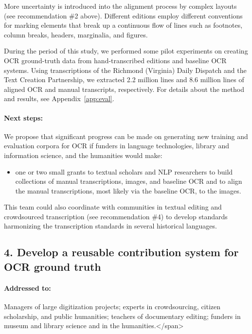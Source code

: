 \documentclass[twoside,11pt]{report}
\begin{document}
More uncertainty is introduced into the alignment process by complex layouts (see recommendation \#2 above). Different editions employ different conventions for marking elements that break up a continuous flow of lines such as footnotes, column breaks, headers, marginalia, and figures.

During the period of this study, we performed some pilot experiments on creating OCR ground-truth data from hand-transcribed editions and baseline OCR systems. Using transcriptions of the Richmond (Virginia) Daily Dispatch and the Text Creation Partnership, we extracted 2.2 million lines and 8.6 million lines of aligned OCR and manual transcripts, respectively. For details about the method and results, see Appendix~\ref{app:eval}.

\paragraph{Next steps:} We propose that significant progress can be made on generating new training and evaluation corpora for OCR if funders in language technologies, library and information science, and the humanities would make:
\begin{itemize}

\item one or two small grants to textual scholars and NLP researchers to build collections of manual transcriptions, images, and baseline OCR and to align the manual transcriptions, most likely via the baseline OCR, to the images.
  
\end{itemize}

This team could also coordinate with communities in textual editing and crowdsourced transcription (see recommendation \#4) to develop standards harmonizing the transcription standards in several historical languages.

\subsection{4. Develop a reusable contribution system for OCR ground truth}
\label{sec:rec-contribution}

\paragraph{Addressed to:} Managers of large digitization projects; experts in crowdsourcing, citizen scholarship, and public humanities; teachers of documentary editing; funders in museum and library science and in the humanities.</span>
\end{document}
